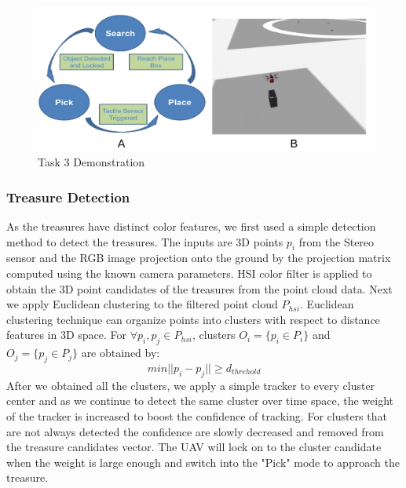\documentclass{standalone}
\begin{document}
 \begin{figure}%
    \begin{center}
      \includegraphics[keepaspectratio=true, width=1\linewidth, height=0.30\textheight]{img//task3.png}
    \end{center}
    \caption{Task 3 Demonstration}
    \label{t3}
  \end{figure}



\subsubsection{Treasure Detection}
As the treasures have distinct color features, we first used a simple detection method to detect the treasures. 
The inputs are 3D points $p_i$ from the Stereo sensor and the RGB image projection onto the ground by the projection matrix computed using the known camera parameters. %
HSI color filter is applied to obtain the 3D point candidates of the treasures from the point cloud data. Next we apply Euclidean clustering to the filtered point cloud $P_{hsi}$. Euclidean clustering technique can organize points into clusters with respect to distance features in 3D space. For $\forall p_i, p_j \in P_{hsi}$, clusters $O_i = \{p_i \in P_i\}$ and $O_j = \{p_j \in P_j\}$ are obtained by:
\begin{equation}\label{eq3-1}
min||p_i - p_j|| \geq d_{threhold} 
\end{equation}
After we obtained all the clusters, we apply a simple tracker to every cluster center and as we continue to detect the same cluster over time space, the weight of the tracker is increased to boost the confidence of tracking. For clusters that are not always detected the confidence are slowly decreased and removed from the treasure candidates vector. The UAV will lock on to the cluster candidate when the weight is large enough and switch into the "Pick" mode to approach the treasure.
\end{document}
